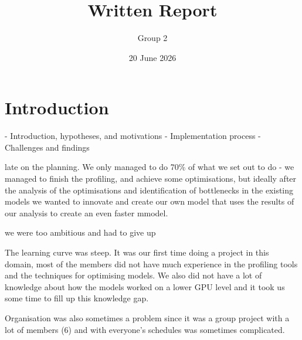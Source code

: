 \documentclass{article}
\title{Written Report}
\author{Group 2}
\date{20 June 2026}
\begin{document}
\maketitle

\section{Introduction}
	

- Introduction, hypotheses, and motivations
- Implementation process
- Challenges and findings




late on the planning. We only managed to do 70\% of what we set out to do - we managed to finish the profiling, and achieve some optimisations, but ideally after the analysis of the optimisations and identification of bottlenecks in the existing models we wanted to innovate and create our own model that uses the results of our analysis to create an even faster mmodel.


we were too ambitious and had to give up 

The learning curve was steep. It was our first time doing a project in this domain, most of the members did not have much experience in the profiling tools and the techniques for optimising models. We also did not have a lot of knowledge about how the models worked on a lower GPU level and it took us some time to fill up this knowledge gap.

Organisation was also sometimes a problem since it was a group project with a lot of members (6) and with everyone's schedules was sometimes complicated.

\end{document}
